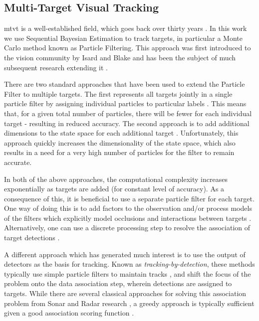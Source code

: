 \subsection{Multi-Target Visual Tracking}
\gls{mtvt} is a well-established field, which goes back over thirty years \cite{MTT_JPDA}. In this work we use  Sequential Bayesian Estimation to track targets, in particular a Monte Carlo method known as Particle Filtering. This approach was first introduced to the vision community by Isard and Blake \cite{Condensation98} and has been the subject of much subsequent research extending it \cite{TrackingMultipleParticleFiltering,MonteCarloMTT,SequentialMonteCarloMultitargetFiltering}.

There are two standard approaches that have been used to extend the Particle Filter to multiple targets. The first represents all targets jointly in a single particle filter by assigning individual particles to particular labels \cite{MultiMixtureTracking03}. This means that, for a given total number of particles, there will be fewer for each individual target - resulting in reduced accuracy. The second approach is to add additional dimensions to the state space for each additional target \cite{TrackMultTargets01}. Unfortunately, this approach quickly increases the dimensionality of the state space, which also results in a need for a very high number of particles for the filter to remain accurate. 

In both of the above approaches, the computational complexity increases exponentially as targets are added (for constant level of accuracy). As a consequence of this, it is beneficial to use a separate particle filter for each target. One way of doing this is to add factors to the observation and/or process models of the filters which explicitly model occlusions and interactions between targets \cite{MCMCPartFilt_05, ApproxMultiTrack_06}. Alternatively, one can use a discrete processing step to resolve the association of target detections \cite{Koo_IROS2013, Breitenstein_ICCV2009}. 

A different approach which has generated much interest is to use the output of detectors as the basis for tracking. Known as \emph{tracking-by-detection}, these methods typically use simple particle filters to maintain tracks \cite{RobustVTMT_06,MultipersonTBD_011}, and shift the focus of the problem onto the data association step, wherein detections are assigned to targets. While there are several classical approaches for solving this association problem from Sonar and Radar research \cite{SonarMultiTrack_83,MultiTrack_79}, a greedy approach is typically sufficient given a good association scoring function \cite{DetTrackMultiHumans_07,MultipersonTBD_011}. 


